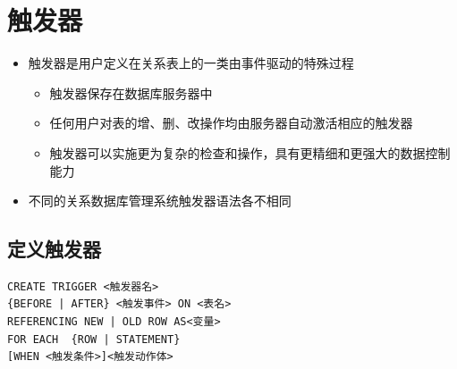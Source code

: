 \section{触发器}
\begin{itemize}
    \item 触发器是用户定义在关系表上的一类由事件驱动的特殊过程
    \begin{itemize}
        \item 触发器保存在数据库服务器中
        \item 任何用户对表的增、删、改操作均由服务器自动激活相应的触发器
        \item 触发器可以实施更为复杂的检查和操作，具有更精细和更强大的数据控制能力
    \end{itemize}
    \item 不同的关系数据库管理系统触发器语法各不相同
\end{itemize}

\subsection{定义触发器}
\begin{lstlisting}
CREATE TRIGGER <触发器名>  
{BEFORE | AFTER} <触发事件> ON <表名>
REFERENCING NEW | OLD ROW AS<变量>
FOR EACH  {ROW | STATEMENT}
[WHEN <触发条件>]<触发动作体>
\end{lstlisting}

